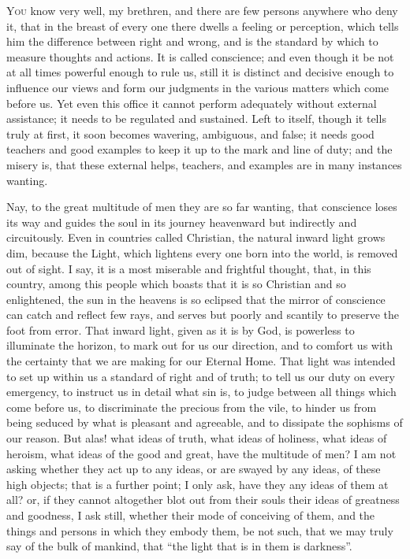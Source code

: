 
Y\textsc{ou} know very well, my brethren, and there are few persons anywhere
who deny it, that in the breast of every one there dwells a feeling or
perception, which tells him the difference between right and wrong,
and is the standard by which to measure thoughts and actions. It is
called conscience; and even though it be not at all times powerful
enough to rule us, still it is distinct and decisive enough to
influence our views and form our judgments in the various matters
which come before us. Yet even this office it cannot perform
adequately without external assistance; it needs to be regulated and
sustained. Left to itself, though it tells truly at first, it soon
becomes wavering, ambiguous, and false; it needs good teachers and
good examples to keep it up to the mark and line of duty; and the
misery is, that these external helps, teachers, and examples are in
many instances wanting.

Nay, to the great multitude of men they are so far wanting, that
conscience loses its way and guides the soul in its journey heavenward
but indirectly and circuitously. Even in countries called Christian,
the natural inward light grows dim, because the Light, which lightens
every one born into the world, is removed out of sight. I say, it is a
most miserable and frightful thought, that, in this country, among
this people which boasts that it is so Christian and so enlightened,
the sun in the heavens is so eclipsed that the mirror of conscience
can catch and reflect few rays, and serves but poorly and scantily to
preserve the foot from error. That inward light, given as it is by
God, is powerless to illuminate the horizon, to mark out for us our
direction, and to comfort us with the certainty that we are making for
our Eternal Home. That light was intended to set up within us a
standard of right and of truth; to tell us our duty on every
emergency, to instruct us in detail what sin is, to judge between all
things which come before us, to discriminate the precious from the
vile, to hinder us from being seduced by what is pleasant and
agreeable, and to dissipate the sophisms of our reason. But alas! what
ideas of truth, what ideas of holiness, what ideas of heroism, what
ideas of the good and great, have the multitude of men? I am not
asking whether they act up to any ideas, or are swayed by any ideas,
of these high objects; that is a further point; I only ask, have they
any ideas of them at all? or, if they cannot altogether blot out from
their souls their ideas of greatness and goodness, I ask still,
whether their mode of conceiving of them, and the things and persons
in which they embody them, be not such, that we may truly say of the
bulk of mankind, that ``the light that is in them is
darkness''.

